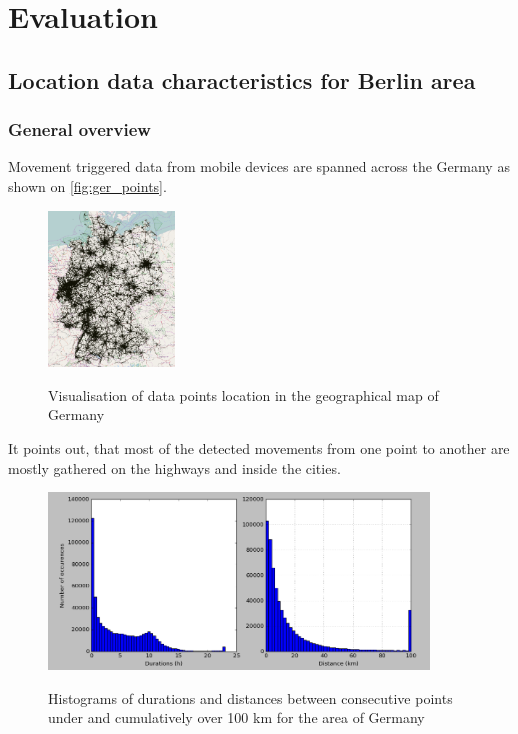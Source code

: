 
\chapter{Evaluation}
\label{cha:evaluation}
 
\section{Location data characteristics for Berlin area}

\subsection{General overview}

Movement triggered data from mobile devices are spanned across the Germany as shown on \autoref{fig:ger_points}. 
\begin{figure}[!ht]
	\centering
	\includegraphics[width=0.3\textwidth]{images/points_germany.png}\\
	\caption{Visualisation of data points location in the geographical map of Germany}
	\label{fig:ger_points}
\end{figure}
\FloatBarrier
It points out, that most of the detected movements from one point to another are mostly gathered on the highways and inside the cities. 
\\
\begin{figure}[!ht]
	\centering
	\includegraphics[width=0.9\textwidth]{images/germany_stats.png}\\
	\caption{Histograms of durations and distances between consecutive points under and cumulatively over 100 km for the area of Germany}
	\label{fig:ger_stats}
\end{figure}
